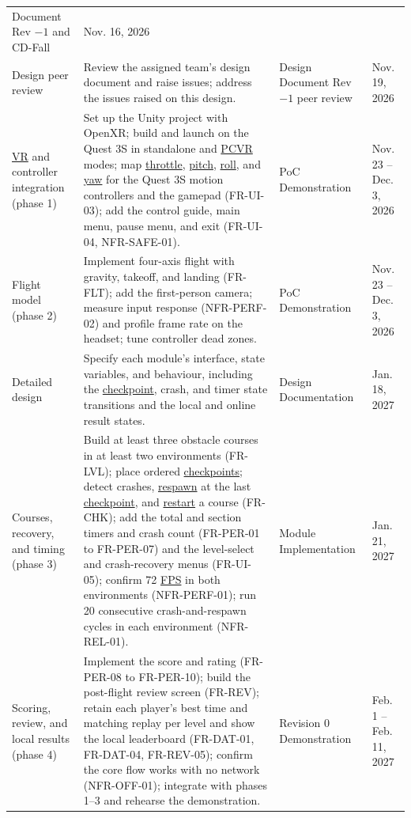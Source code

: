 \documentclass[12pt]{article}
\begin{document}
\begin{longtable}{@{}p{}p{}p{}p{}@{}}
Document Rev $-1$ and CD-Fall & Nov. 16, 2026 \\
Design peer review & Review the assigned team's design document and raise
issues; address the issues raised on this design. & Design Document
Rev $-1$ peer review & Nov. 19, 2026 \\
\hyperlink{glos:VR}{VR} and controller integration (phase 1) & Set up the Unity project with
OpenXR; build and launch on the Quest 3S in standalone and \hyperlink{glos:PCVR}{PCVR} modes; map
\hyperlink{glos:Throttle}{throttle}, \hyperlink{glos:Throttle}{pitch}, \hyperlink{glos:Throttle}{roll}, and \hyperlink{glos:Throttle}{yaw} for the Quest 3S motion controllers and the
gamepad (FR-UI-03); add the control guide, main menu, pause menu, and exit
(FR-UI-04, NFR-SAFE-01). & PoC Demonstration &
Nov. 23 -- Dec. 3, 2026 \\
Flight model (phase 2) & Implement four-axis flight with gravity, takeoff, and
landing (FR-FLT); add the first-person camera;
measure input response (NFR-PERF-02) and profile frame rate on the headset;
tune controller dead zones. & PoC Demonstration &
Nov. 23 -- Dec. 3, 2026 \\
Detailed design & Specify each module's interface, state variables, and
behaviour, including the \hyperlink{glos:Checkpoint}{checkpoint}, crash, and timer state transitions and
the local and online result states. &
Design Documentation & Jan. 18, 2027 \\
Courses, recovery, and timing (phase 3) & Build at least three obstacle
courses in at least two environments
(FR-LVL); place ordered \hyperlink{glos:Checkpoint}{checkpoints}; detect
crashes, \hyperlink{glos:Respawn}{respawn} at the last \hyperlink{glos:Checkpoint}{checkpoint}, and \hyperlink{glos:Respawn}{restart} a course
(FR-CHK); add the total and section timers and crash count (FR-PER-01 to
FR-PER-07) and the level-select and crash-recovery menus (FR-UI-05); confirm
72 \hyperlink{glos:FPS}{FPS} in both environments (NFR-PERF-01); run 20 consecutive
crash-and-respawn cycles in each environment (NFR-REL-01). & Module Implementation & Jan. 21, 2027 \\
Scoring, review, and local results (phase 4) & Implement the score and
rating (FR-PER-08 to FR-PER-10); build the post-flight review screen
(FR-REV); retain each player's best time and matching replay per level and
show the local leaderboard (FR-DAT-01, FR-DAT-04, FR-REV-05);
confirm the core flow works with no network
(NFR-OFF-01); integrate with phases 1--3 and rehearse the demonstration. &
Revision 0 Demonstration & Feb. 1 -- Feb. 11, 2027 \\

\end{longtable}
\end{document}
